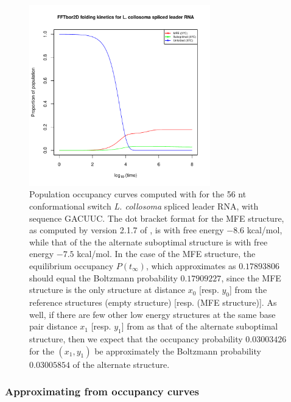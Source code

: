 \begin{figure}[!ht]
\centering
\includegraphics[width=0.7\textwidth]{Figures/Hermes/populationOccupancyCurves.pdf}
\caption{
Population occupancy curves computed with \ffteq for the
56 nt conformational switch {\em L. collosoma} spliced leader RNA,
with sequence 
GACUUC. The dot bracket format for the MFE structure, as computed by
version 2.1.7 of , is
 with free
energy $-8.6$ kcal/mol, while that of the the alternate suboptimal
structure is
 with free
energy $-7.5$ kcal/mol. In the case of the MFE structure, the
equilibrium occupancy $P(t_{\infty})$, which \hermes approximates
as $0.17893806$ should equal the Boltzmann probability $0.17909227$,
since the MFE structure is the only structure at distance $x_0$ [resp.
$y_0$] from the reference structures \strA (empty
structure) [resp. \strB (MFE structure)]. As well, if there are few
other low energy structures at the same base pair distance $x_1$
[resp. $y_1$] from  as that of the alternate suboptimal
structure, then we expect that the occupancy probability $0.03003426$
for the $(x_1,y_1)$ be approximately the Boltzmann probability
$0.03005854$ of the alternate structure.}
\label{fig:hermes:populationOccupancySplicedLeader}
\end{figure}

\subsubsection{Approximating \eqt from occupancy curves}
\label{subsubsec:hermes:eqestimate}

